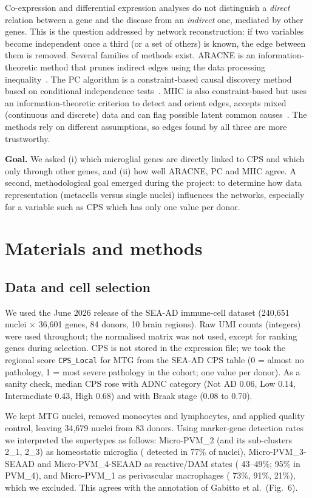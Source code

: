 Co-expression and differential expression analyses do not distinguish a \emph{direct} relation between a gene and the disease from an \emph{indirect} one, mediated by other genes. This is the question addressed by network reconstruction: if two variables become independent once a third (or a set of others) is known, the edge between them is removed. Several families of methods exist. ARACNE is an information-theoretic method that prunes indirect edges using the data processing inequality~\cite{Margolin2006}. The PC algorithm is a constraint-based causal discovery method based on conditional independence tests~\cite{Spirtes2000}. MIIC is also constraint-based but uses an information-theoretic criterion to detect and orient edges, accepts mixed (continuous and discrete) data and can flag possible latent common causes~\cite{Verny2017,Cabeli2020}. The methods rely on different assumptions, so edges found by all three are more trustworthy.

\textbf{Goal.} We asked (i) which microglial genes are directly linked to CPS and which only through other genes, and (ii) how well ARACNE, PC and MIIC agree. A second, methodological goal emerged during the project: to determine how data representation (metacells versus single nuclei) influences the networks, especially for a variable such as CPS which has only one value per donor.

\section{Materials and methods}
\subsection{Data and cell selection}
We used the June 2026 release of the SEA-AD immune-cell dataset (240{,}651 nuclei $\times$ 36{,}601 genes, 84 donors, 10 brain regions). Raw UMI counts (integers) were used throughout; the normalised matrix was not used, except for ranking genes during selection. CPS is not stored in the expression file; we took the regional score \texttt{CPS\_Local} for MTG from the SEA-AD CPS table (0 = almost no pathology, 1 = most severe pathology in the cohort; one value per donor). As a sanity check, median CPS rose with ADNC category (Not AD 0.06, Low 0.14, Intermediate 0.43, High 0.68) and with Braak stage (0.08 to 0.70).

We kept MTG nuclei, removed monocytes and lymphocytes, and applied quality control, leaving 34{,}679 nuclei from 83 donors. Using marker-gene detection rates we interpreted the supertypes as follows: Micro-PVM\_2 (and its sub-clusters 2\_1, 2\_3) as homeostatic microglia ( detected in 77\% of nuclei), Micro-PVM\_3-SEAAD and Micro-PVM\_4-SEAAD as reactive/DAM states ( 43--49\%;  95\% in PVM\_4), and Micro-PVM\_1 as perivascular macrophages ( 73\%,  91\%,  21\%), which we excluded. This agrees with the annotation of Gabitto et al.\ (Fig.~6).

